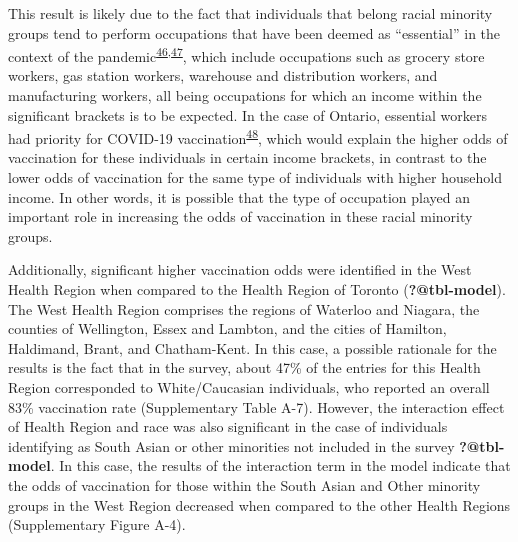 \documentclass[
  letterpaper,
  DIV=11,
  numbers=noendperiod]{scrartcl}
\begin{document}
This result is likely due to the fact that individuals that belong
racial minority groups tend to perform occupations that have been deemed
as ``essential'' in the context of the
pandemic\textsuperscript{\protect\hyperlink{ref-hawkins2020}{46},\protect\hyperlink{ref-ct2021}{47}},
which include occupations such as grocery store workers, gas station
workers, warehouse and distribution workers, and manufacturing workers,
all being occupations for which an income within the significant
brackets is to be expected. In the case of Ontario, essential workers
had priority for COVID-19
vaccination\textsuperscript{\protect\hyperlink{ref-mishra2021}{48}},
which would explain the higher odds of vaccination for these individuals
in certain income brackets, in contrast to the lower odds of vaccination
for the same type of individuals with higher household income. In other
words, it is possible that the type of occupation played an important
role in increasing the odds of vaccination in these racial minority
groups.

Additionally, significant higher vaccination odds were identified in the
West Health Region when compared to the Health Region of Toronto
(\textbf{?@tbl-model}). The West Health Region comprises the regions of
Waterloo and Niagara, the counties of Wellington, Essex and Lambton, and
the cities of Hamilton, Haldimand, Brant, and Chatham-Kent. In this
case, a possible rationale for the results is the fact that in the
survey, about 47\% of the entries for this Health Region corresponded to
White/Caucasian individuals, who reported an overall 83\% vaccination
rate (Supplementary Table A-7). However, the interaction effect of
Health Region and race was also significant in the case of individuals
identifying as South Asian or other minorities not included in the
survey \textbf{?@tbl-model}. In this case, the results of the
interaction term in the model indicate that the odds of vaccination for
those within the South Asian and Other minority groups in the West
Region decreased when compared to the other Health Regions
(Supplementary Figure A-4).
\end{document}
